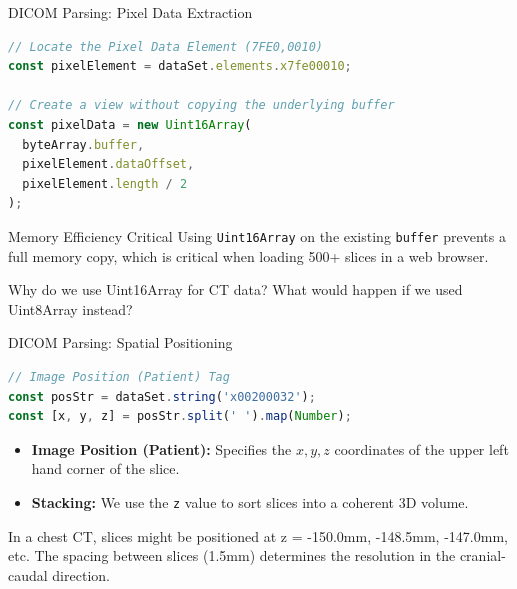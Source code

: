 \begin{frame}[fragile]{DICOM Parsing: Pixel Data Extraction}
\begin{lstlisting}[language=JavaScript]
// Locate the Pixel Data Element (7FE0,0010)
const pixelElement = dataSet.elements.x7fe00010;

// Create a view without copying the underlying buffer
const pixelData = new Uint16Array(
  byteArray.buffer, 
  pixelElement.dataOffset, 
  pixelElement.length / 2
);
\end{lstlisting}
\vfill
\begin{alertblock}{Memory Efficiency Critical}
Using \texttt{Uint16Array} on the existing \texttt{buffer} prevents a full memory copy, which is critical when loading 500+ slices in a web browser.
\end{alertblock}

Why do we use Uint16Array for CT data? What would happen if we used Uint8Array instead?
\end{frame}

\begin{frame}[fragile]{DICOM Parsing: Spatial Positioning}
\begin{lstlisting}[language=JavaScript]
// Image Position (Patient) Tag
const posStr = dataSet.string('x00200032');
const [x, y, z] = posStr.split(' ').map(Number);
\end{lstlisting}
\vfill
\begin{itemize}
    \item \textbf{Image Position (Patient):} Specifies the $x, y, z$ coordinates of the upper left hand corner of the slice.
    \item \textbf{Stacking:} We use the \texttt{z} value to sort slices into a coherent 3D volume.
\end{itemize}

In a chest CT, slices might be positioned at z = -150.0mm, -148.5mm, -147.0mm, etc. The spacing between slices (1.5mm) determines the resolution in the cranial-caudal direction.
\end{frame}

